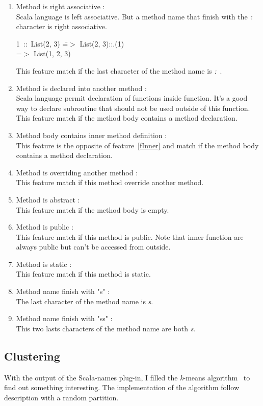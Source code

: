 \documentclass[12pt]{article}
\newcommand{\code}[1]{{\fontfamily{phv}\selectfont \begin{tabbing} #1 \end{tabbing}}}
\begin{document}
\begin{enumerate}
\item Method is right associative :\\
	Scala language is left associative. But a method name that finish with the \textit{:} character is right associative.
\code{
1\ ::\ List(2, 3) \==$>$ List(2, 3)::.(1)\\
\>=$>$ List(1, 2, 3)
}
This feature match if the last character of the method name is \textit{:}\ .
\item Method is declared into another method :\label{fInner}\\
	Scala language permit declaration of functions inside function. It's a good way to declare subroutine that should not be used outside of this function.\\
This feature match if the method body contains a method declaration.
\item Method body contains inner method definition :\\
	This feature is the opposite of feature~\ref{fInner} and match if the method body contains a method declaration.
\item Method is overriding another method : \\
	This feature match if this method override another method.
\item Method is abstract :\\
	This feature match if the method body is empty.
\item Method is public :\\
	This feature match if this method is public. Note that inner function are always public but can't be accessed from outside.
\item Method is static :\\
	This feature match if this method is static. 
\item Method name finish with "s" :\label{fs}\\
	The last character of the method name is \textit{s}.
\item Method name finish with "ss" : \label{fss} \\
	This two lasts characters of the method name are both \textit{s}.

\end{enumerate}

\subsection{Clustering}
With the output of the Scala-names plug-in, I filled the \textit{k}-means algorithm~\cite{kMeans} to find out something interesting. The implementation of the algorithm follow~\cite{kMeans} description with a random partition.
\end{document}
